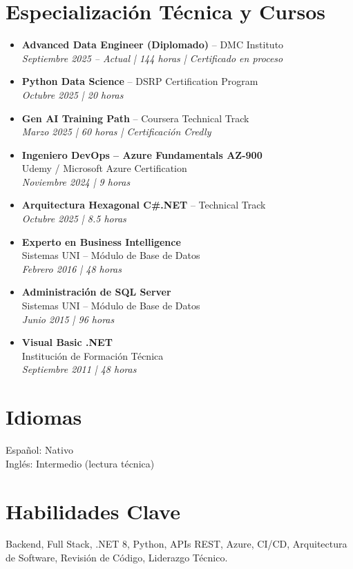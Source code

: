 \documentclass[11pt,a4paper]{article}
\begin{document}
\section*{Especialización Técnica y Cursos}
\begin{itemize}
   \item \textbf{Advanced Data Engineer (Diplomado)} – DMC Instituto\\
  \textit{Septiembre 2025 – Actual | 144 horas | Certificado en proceso}

  \item \textbf{Python Data Science} – DSRP Certification Program\\
  \textit{Octubre 2025 | 20 horas}

  \item \textbf{Gen AI Training Path} – Coursera Technical Track\\
  \textit{Marzo 2025 | 60 horas | Certificación Credly}

  \item \textbf{Ingeniero DevOps – Azure Fundamentals AZ-900}\\
  Udemy / Microsoft Azure Certification\\
  \textit{Noviembre 2024 | 9 horas}

  \item \textbf{Arquitectura Hexagonal C\#.NET} – Technical Track\\
  \textit{Octubre 2025 | 8.5 horas}

  \item \textbf{Experto en Business Intelligence}\\
  Sistemas UNI – Módulo de Base de Datos\\
  \textit{Febrero 2016 | 48 horas}

  \item \textbf{Administración de SQL Server}\\
  Sistemas UNI – Módulo de Base de Datos\\
  \textit{Junio 2015 | 96 horas}

  \item \textbf{Visual Basic .NET}\\
  Institución de Formación Técnica\\
  \textit{Septiembre 2011 | 48 horas}
\end{itemize}
\section*{Idiomas}

Español: Nativo\\
Inglés: Intermedio (lectura técnica)

\section*{Habilidades Clave}

Backend, Full Stack, .NET 8, Python, APIs REST, Azure, CI/CD, Arquitectura de Software, Revisión de Código, Liderazgo Técnico.
\end{document}
